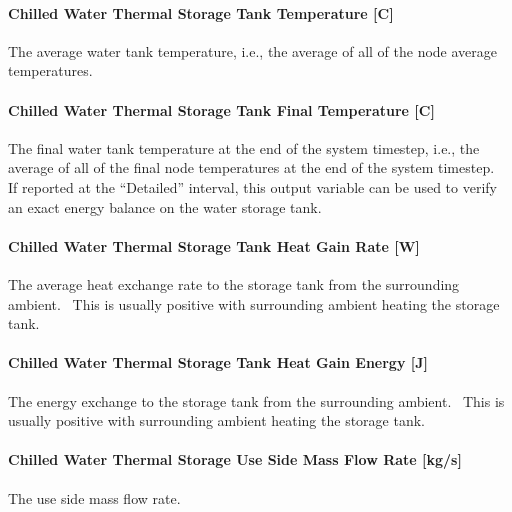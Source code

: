 \paragraph{Chilled Water Thermal Storage Tank Temperature {[}C{]}}\label{chilled-water-thermal-storage-tank-temperature-c-1}

The average water tank temperature, i.e., the average of all of the node average temperatures.

\paragraph{Chilled Water Thermal Storage Tank Final Temperature {[}C{]}}\label{chilled-water-thermal-storage-tank-final-temperature-c}

The final water tank temperature at the end of the system timestep, i.e., the average of all of the final node temperatures at the end of the system timestep.~ If reported at the ``Detailed'' interval, this output variable can be used to verify an exact energy balance on the water storage tank.

\paragraph{Chilled Water Thermal Storage Tank Heat Gain Rate {[}W{]}}\label{chilled-water-thermal-storage-tank-heat-gain-rate-w-1}

The average heat exchange rate to the storage tank from the surrounding ambient.~ This is usually positive with surrounding ambient heating the storage tank.

\paragraph{Chilled Water Thermal Storage Tank Heat Gain Energy {[}J{]}}\label{chilled-water-thermal-storage-tank-heat-gain-energy-j-1}

The energy exchange to the storage tank from the surrounding ambient.~ This is usually positive with surrounding ambient heating the storage tank.

\paragraph{Chilled Water Thermal Storage Use Side Mass Flow Rate {[}kg/s{]}}\label{chilled-water-thermal-storage-use-side-mass-flow-rate-kgs-1}

The use side mass flow rate.

